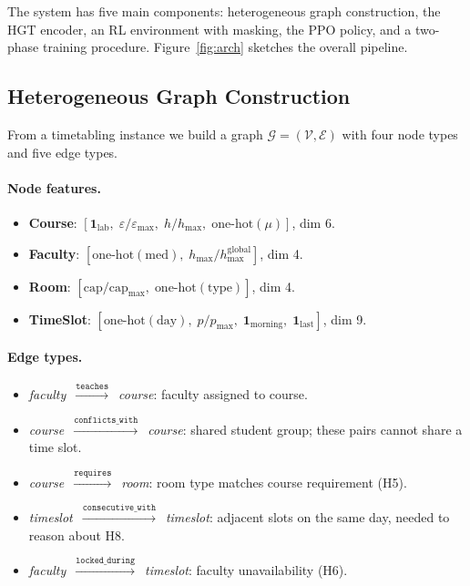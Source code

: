 \documentclass[conference]{IEEEtran}
\begin{document}
The system has five main components: heterogeneous graph construction, the HGT encoder, an RL environment with masking, the PPO policy, and a two-phase training procedure. Figure~\ref{fig:arch} sketches the overall pipeline.

\subsection{Heterogeneous Graph Construction}

From a timetabling instance we build a graph $\mathcal{G} = (\mathcal{V}, \mathcal{E})$ with four node types and five edge types.

\paragraph{Node features.}
\begin{itemize}
  \item \textbf{Course}: $[\mathbf{1}_\text{lab},\; \varepsilon/\varepsilon_\text{max},\; h/h_\text{max},\; \text{one-hot}(\mu)]$, dim 6.
  \item \textbf{Faculty}: $[\text{one-hot}(\text{med}),\; h_\text{max}/h_\text{max}^\text{global}]$, dim 4.
  \item \textbf{Room}: $[\text{cap}/\text{cap}_\text{max},\; \text{one-hot}(\text{type})]$, dim 4.
  \item \textbf{TimeSlot}: $[\text{one-hot}(\text{day}),\; p/p_\text{max},\; \mathbf{1}_\text{morning},\; \mathbf{1}_\text{last}]$, dim 9.
\end{itemize}

\paragraph{Edge types.}
\begin{itemize}
  \item \textit{faculty}~$\xrightarrow{\texttt{teaches}}$~\textit{course}: faculty assigned to course.
  \item \textit{course}~$\xrightarrow{\texttt{conflicts\_with}}$~\textit{course}: shared student group; these pairs cannot share a time slot.
  \item \textit{course}~$\xrightarrow{\texttt{requires}}$~\textit{room}: room type matches course requirement (H5).
  \item \textit{timeslot}~$\xrightarrow{\texttt{consecutive\_with}}$~\textit{timeslot}: adjacent slots on the same day, needed to reason about H8.
  \item \textit{faculty}~$\xrightarrow{\texttt{locked\_during}}$~\textit{timeslot}: faculty unavailability (H6).
\end{itemize}
\end{document}
